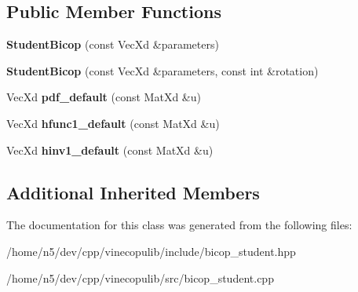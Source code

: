 \subsection*{Public Member Functions}
\begin{DoxyCompactItemize}
\item 
{\bfseries Student\+Bicop} (const Vec\+Xd \&parameters)\hypertarget{class_student_bicop_a3c022a1efe1060453b3418f1fa55ebaa}{}\label{class_student_bicop_a3c022a1efe1060453b3418f1fa55ebaa}

\item 
{\bfseries Student\+Bicop} (const Vec\+Xd \&parameters, const int \&rotation)\hypertarget{class_student_bicop_a74ee1a778893916dd4fe0745562d784c}{}\label{class_student_bicop_a74ee1a778893916dd4fe0745562d784c}

\item 
Vec\+Xd {\bfseries pdf\+\_\+default} (const Mat\+Xd \&u)\hypertarget{class_student_bicop_a398dcd183989b356e63b7b929b062b39}{}\label{class_student_bicop_a398dcd183989b356e63b7b929b062b39}

\item 
Vec\+Xd {\bfseries hfunc1\+\_\+default} (const Mat\+Xd \&u)\hypertarget{class_student_bicop_ac7b273165caa154d649bb0f2e25833c6}{}\label{class_student_bicop_ac7b273165caa154d649bb0f2e25833c6}

\item 
Vec\+Xd {\bfseries hinv1\+\_\+default} (const Mat\+Xd \&u)\hypertarget{class_student_bicop_abf90b4ed51ca88f166e6ed679c22e183}{}\label{class_student_bicop_abf90b4ed51ca88f166e6ed679c22e183}

\end{DoxyCompactItemize}
\subsection*{Additional Inherited Members}


The documentation for this class was generated from the following files\+:\begin{DoxyCompactItemize}
\item 
/home/n5/dev/cpp/vinecopulib/include/bicop\+\_\+student.\+hpp\item 
/home/n5/dev/cpp/vinecopulib/src/bicop\+\_\+student.\+cpp\end{DoxyCompactItemize}
